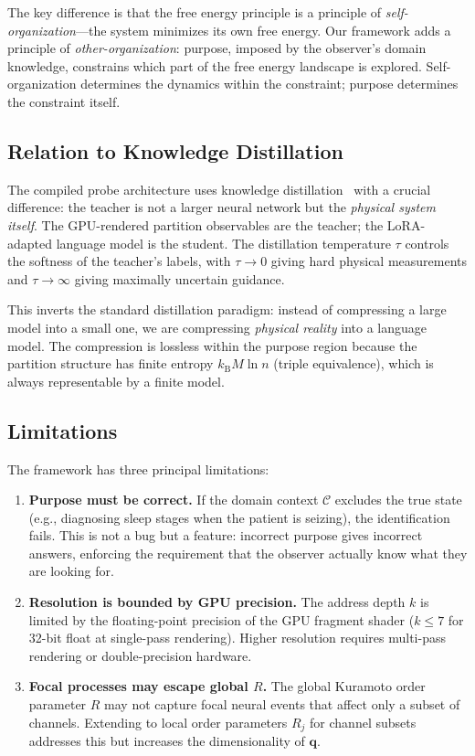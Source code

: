 \documentclass[aps,prd,twocolumn,superscriptaddress,floatfix,nofootinbib]{revtex4-2}
\theoremstyle{remark}
\newcommand{\kB}{k_{\mathrm{B}}}
\newcommand{\qvec}{\mathbf{q}}
\newcommand{\Context}{\mathcal{C}}
\begin{document}
The key difference is that the free energy principle is a principle of \emph{self-organization}---the system minimizes its own free energy.
Our framework adds a principle of \emph{other-organization}: purpose, imposed by the observer's domain knowledge, constrains which part of the free energy landscape is explored.
Self-organization determines the dynamics within the constraint; purpose determines the constraint itself.

\subsection{Relation to Knowledge Distillation}

The compiled probe architecture uses knowledge distillation~\cite{hinton2015distilling} with a crucial difference: the teacher is not a larger neural network but the \emph{physical system itself}.
The GPU-rendered partition observables are the teacher; the LoRA-adapted language model is the student.
The distillation temperature $\tau$ controls the softness of the teacher's labels, with $\tau \to 0$ giving hard physical measurements and $\tau \to \infty$ giving maximally uncertain guidance.

This inverts the standard distillation paradigm: instead of compressing a large model into a small one, we are compressing \emph{physical reality} into a language model.
The compression is lossless within the purpose region because the partition structure has finite entropy $\kB M \ln n$ (triple equivalence), which is always representable by a finite model.

\subsection{Limitations}

The framework has three principal limitations:
\begin{enumerate}[noitemsep]
    \item \textbf{Purpose must be correct.}
    If the domain context $\Context$ excludes the true state (e.g., diagnosing sleep stages when the patient is seizing), the identification fails.
    This is not a bug but a feature: incorrect purpose gives incorrect answers, enforcing the requirement that the observer actually know what they are looking for.

    \item \textbf{Resolution is bounded by GPU precision.}
    The address depth $k$ is limited by the floating-point precision of the GPU fragment shader ($k \leq 7$ for 32-bit float at single-pass rendering).
    Higher resolution requires multi-pass rendering or double-precision hardware.

    \item \textbf{Focal processes may escape global $R$.}
    The global Kuramoto order parameter $R$ may not capture focal neural events that affect only a subset of channels.
    Extending to local order parameters $R_j$ for channel subsets addresses this but increases the dimensionality of $\qvec$.
\end{enumerate}
\end{document}
